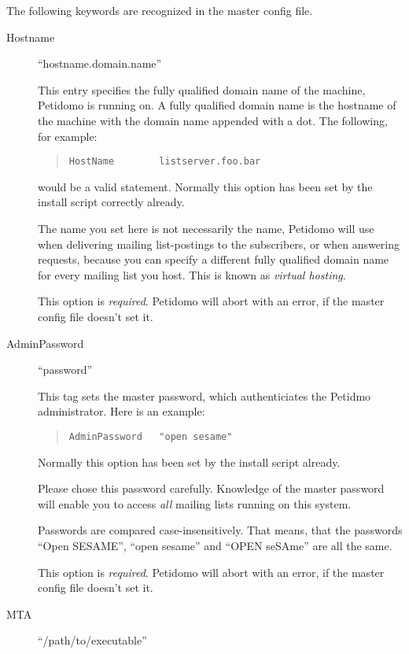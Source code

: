 \documentclass[a4paper,11pt]{scrreprt}
\newcommand{\Def}[1]{{\sl #1}}
\begin{document}
The following keywords are recognized in the master config file.

\begin{description}

\item[Hostname] \hfill ``hostname.domain.name''

This entry specifies the fully qualified domain name of the machine,
Petidomo is running on. A fully qualified domain name is the
hostname of the machine with the domain name appended with a dot. The
following, for example:
\begin{quote}
\begin{verbatim}
HostName        listserver.foo.bar
\end{verbatim}
\end{quote}
would be a valid statement. Normally this option has been set by the
install script correctly already.

The name you set here is not necessarily the name, Petidomo will use
when delivering mailing list-postings to the subscribers, or when
answering requests, because you can specify a different fully
qualified domain name for every mailing list you host. This is known
as \Def{virtual hosting}.

This option is \emph{required}. Petidomo will abort with an error,
if the master config file doesn't set it.

\item[AdminPassword] \hfill ``password''

This tag sets the master password, which authenticiates the Petidmo
administrator. Here is an example:
\begin{quote}
\begin{verbatim}
AdminPassword   "open sesame"
\end{verbatim}
\end{quote}
Normally this option has been set by the install script already.

Please chose this password carefully. Knowledge of the master password
will enable you to access \emph{all} mailing lists running on this
system.

Passwords are compared case-insensitively. That means, that the
passwords ``Open SESAME'', ``open sesame'' and ``OPEN seSAme'' are all
the same.

This option is \emph{required}. Petidomo will abort with an error,
if the master config file doesn't set it.


\item[MTA] \hfill ``/path/to/executable''


\end{description}
\end{document}
